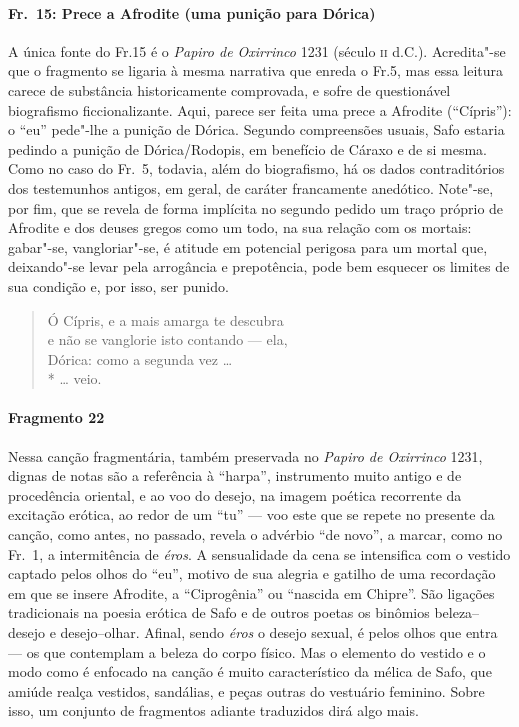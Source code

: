 \paragraph{Fr.~15: Prece a Afrodite (uma punição para Dórica)}

{\small A única fonte do Fr.15 é o \textit{Papiro de Oxirrinco} 1231 (século \textsc{ii} d.C.).
Acredita"-se que o fragmento se ligaria à mesma narrativa que enreda o Fr.5, mas essa
leitura carece de substância historicamente comprovada, e sofre de
questionável biografismo ficcionalizante. Aqui,
parece ser feita uma prece a Afrodite (“Cípris”): o “eu” pede"-lhe a
punição de Dórica. Segundo compreensões usuais, Safo estaria pedindo a punição
de Dórica/Rodopis, em benefício de Cáraxo e de si mesma. Como no caso do Fr.~5,
todavia, além do biografismo, há os dados contraditórios dos testemunhos
antigos, em geral, de caráter francamente anedótico. Note"-se, por fim, que se
revela de forma implícita no segundo pedido um traço próprio de Afrodite e dos
deuses gregos como um todo, na sua relação com os mortais: gabar"-se,
vangloriar"-se, é atitude em potencial perigosa para um mortal que,
deixando"-se levar pela arrogância e prepotência, pode bem esquecer
os limites de sua condição e, por isso, ser punido.}

\begin{verse}
Ó Cípris, e a mais amarga te descubra\\
e não se vanglorie isto contando --- ela,\\
Dórica: como a segunda vez \ldots{}\\*
\ldots{} veio.
\end{verse}


\paragraph{Fragmento 22}

{\small Nessa canção fragmentária, também preservada no \textit{Papiro de Oxirrinco}
1231, dignas de notas são a referência à ``harpa'', instrumento muito
antigo e de procedência oriental, e ao voo do desejo, na imagem poética
recorrente da excitação erótica, ao redor de um “tu” --- voo este que se repete
no presente da canção, como antes, no passado, revela o advérbio ``de
novo”, a marcar, como no Fr.~1, a intermitência de \textit{éros}. A
sensualidade da cena se intensifica com o vestido captado pelos olhos do “eu”,
motivo de sua alegria e gatilho de uma recordação em que se insere Afrodite, a
``Ciprogênia'' ou “nascida em Chipre”. São ligações tradicionais na
poesia erótica de Safo e de outros poetas os binômios beleza--desejo e
desejo--olhar. Afinal, sendo \textit{éros} o desejo sexual, é pelos olhos que entra --- os que contemplam a beleza do corpo físico. Mas o elemento do vestido e o modo como é enfocado na canção é muito característico da mélica de Safo, que amiúde realça vestidos, sandálias, e peças outras do vestuário feminino. Sobre isso, um conjunto de fragmentos adiante traduzidos dirá algo mais.}

